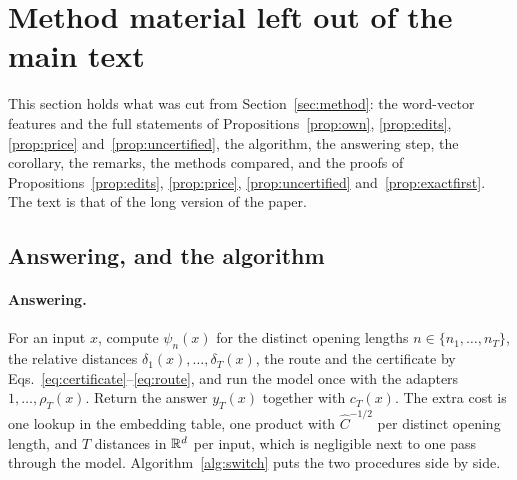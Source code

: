 \FloatBarrier
\section{Method material left out of the main text}
\label{app:method}

This section holds what was cut from Section~\ref{sec:method}: the word-vector features and the full
statements of Propositions~\ref{prop:own}, \ref{prop:edits}, \ref{prop:price} and~\ref{prop:uncertified},
the algorithm, the answering step, the corollary, the remarks, the methods compared, and the proofs
of Propositions~\ref{prop:edits}, \ref{prop:price}, \ref{prop:uncertified} and~\ref{prop:exactfirst}.
The text is that of the long version of the paper.

\subsection{Answering, and the algorithm}
\paragraph{Answering.} For an input $x$, compute $\psi_{n}(x)$ for the distinct opening lengths
$n \in \{n_1, \dots, n_T\}$, the relative distances $\delta_1(x), \dots, \delta_T(x)$, the route and
the certificate by Eqs.~\eqref{eq:certificate}--\eqref{eq:route}, and run the model once with the
adapters $1, \dots, \rho_T(x)$. Return the answer $y_T(x)$ together with $c_T(x)$. The extra cost is
one lookup in the embedding table, one product with $\hat C^{-1/2}$ per distinct opening length, and $T$ distances in $\mathbb{R}^d$ per input, which is negligible next to
one pass through the model.
Algorithm~\ref{alg:switch} puts the two procedures side by side.

